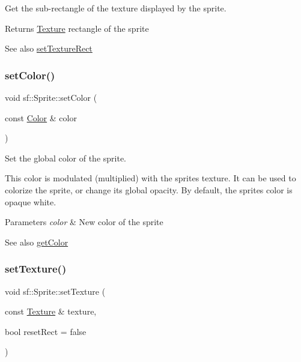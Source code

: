 Get the sub-\/rectangle of the texture displayed by the sprite. 

\begin{DoxyReturn}{Returns}
\hyperlink{classsf_1_1_texture}{Texture} rectangle of the sprite
\end{DoxyReturn}
\begin{DoxySeeAlso}{See also}
\hyperlink{classsf_1_1_sprite_a3fefec419a4e6a90c0fd54c793d82ec2}{set\+Texture\+Rect} 
\end{DoxySeeAlso}
\mbox{\label{classsf_1_1_sprite_a14def44da6437bfea20c4df5e71aba4c}} 
\subsubsection{\texorpdfstring{set\+Color()}{setColor()}}
{\footnotesize\ttfamily void sf\+::\+Sprite\+::set\+Color (\begin{DoxyParamCaption}\item[{const \hyperlink{classsf_1_1_color}{Color} \&}]{color }\end{DoxyParamCaption})}



Set the global color of the sprite. 

This color is modulated (multiplied) with the sprite\textquotesingle{}s texture. It can be used to colorize the sprite, or change its global opacity. By default, the sprite\textquotesingle{}s color is opaque white.


\begin{DoxyParams}{Parameters}
{\em color} & New color of the sprite\\
\hline
\end{DoxyParams}
\begin{DoxySeeAlso}{See also}
\hyperlink{classsf_1_1_sprite_ac5f419f37b4e38f7a94186e3a3e303e1}{get\+Color} 
\end{DoxySeeAlso}
\mbox{\label{classsf_1_1_sprite_a3729c88d88ac38c19317c18e87242560}} 
\subsubsection{\texorpdfstring{set\+Texture()}{setTexture()}}
{\footnotesize\ttfamily void sf\+::\+Sprite\+::set\+Texture (\begin{DoxyParamCaption}\item[{const \hyperlink{classsf_1_1_texture}{Texture} \&}]{texture,  }\item[{bool}]{reset\+Rect = {\ttfamily false} }\end{DoxyParamCaption})}



